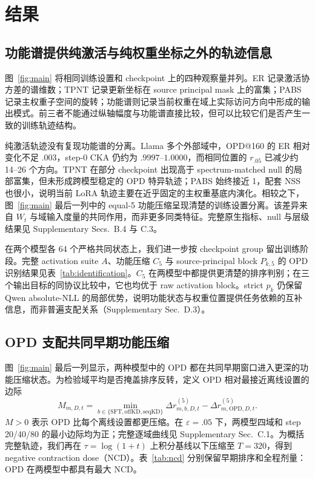 \section{结果}



\subsection{功能谱提供纯激活与纯权重坐标之外的轨迹信息}

图~\ref{fig:main} 将相同训练设置和 checkpoint 上的四种观察量并列。ER 记录激活协方差的谱维数；TPNT 记录更新坐标在 source principal mask 上的富集；PABS 记录主权重子空间的旋转；功能谱则记录当前权重在域上实际访问方向中形成的输出模式。前三者不能通过纵轴幅度与功能谱直接比较，但可以比较它们是否产生一致的训练轨迹结构。

纯激活轨迹没有复现功能谱的分离。Llama 多个外部域中，OPD@160 的 ER 相对变化不足 $.003$，step-0 CKA 仍约为 $.9997$--$1.0000$，而相同位置的 $r_{.05}$ 已减少约 14--26 个方向。TPNT 在部分 checkpoint 出现高于 spectrum-matched null 的局部富集，但未形成跨模型稳定的 OPD 特异轨迹；PABS 始终接近 1，配套 NSS 也很小，说明当前 LoRA 轨迹主要在近乎固定的主权重基底内演化。相较之下，图~\ref{fig:main} 最后一列中的 equal-5 功能压缩呈现清楚的训练设置分离。该差异来自 $W_t$ 与域输入度量的共同作用，而非更多同类特征。完整原生指标、null 与层级结果见 Supplementary Secs.~B.4 与 C.3。

在两个模型各 64 个严格共同状态上，我们进一步按 checkpoint group 留出训练阶段。完整 activation suite $A$、功能压缩 $C_5$ 与 source-principal block $P_{k,5}$ 的 OPD 识别结果见表~\ref{tab:identification}。$C_5$ 在两模型中都提供更清楚的排序判别；在三个输出目标的同协议比较中，它也均优于 raw activation block。strict $p_k$ 仍保留 Qwen absolute-NLL 的局部优势，说明功能状态与权重位置提供任务依赖的互补信息，而非普遍支配关系（Supplementary Sec.~D.3）。

\subsection{OPD 支配共同早期功能压缩}

图~\ref{fig:main} 最后一列显示，两种模型中的 OPD 都在共同早期窗口进入更深的功能压缩状态。为检验域平均是否掩盖排序反转，定义 OPD 相对最接近离线设置的边际
\begin{equation}
M_{m,D,t}
=\min_{b\in\{\mathrm{SFT,offKD,seqKD}\}}\Delta r_{m,b,D,t}^{(5)}
-\Delta r_{m,\mathrm{OPD},D,t}^{(5)}.
\end{equation}
$M>0$ 表示 OPD 比每个离线设置都更压缩。在 $\varepsilon=.05$ 下，两模型四域和 step 20/40/80 的最小边际均为正；完整逐域曲线见 Supplementary Sec.~C.1。为概括完整轨迹，我们再在 $\tau=\log(1+t)$ 上积分基线以下压缩至 $T=320$，得到 negative contraction dose（NCD）。表~\ref{tab:ncd} 分别保留早期排序和全程剂量：OPD 在两模型中都具有最大 NCD。

